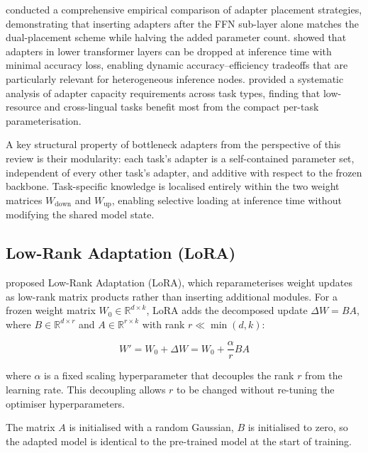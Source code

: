 \citet{HeEffectiveness2021} conducted a comprehensive empirical comparison of adapter
placement strategies, demonstrating that inserting adapters after the FFN sub-layer
alone matches the dual-placement scheme while halving the added parameter count.
\citet{RuckleAdapterDrop2021} showed that adapters in lower transformer layers can be
dropped at inference time with minimal accuracy loss, enabling dynamic accuracy--efficiency
tradeoffs that are particularly relevant for heterogeneous inference nodes.
\citet{PothAdapters2023} provided a systematic analysis of adapter capacity requirements
across task types, finding that low-resource and cross-lingual tasks benefit most from
the compact per-task parameterisation.

A key structural property of bottleneck adapters from the perspective of this review is
their modularity: each task's adapter is a self-contained parameter set, independent of
every other task's adapter, and additive with respect to the frozen backbone.
Task-specific knowledge is localised entirely within the two weight matrices
$W_\mathrm{down}$ and $W_\mathrm{up}$, enabling selective loading at inference time
without modifying the shared model state.

\subsection{Low-Rank Adaptation (LoRA)}
\label{sec:peft:lora}

\citet{Hu2022} proposed Low-Rank Adaptation (LoRA), which reparameterises weight updates
as low-rank matrix products rather than inserting additional modules. For a frozen
weight matrix $W_0 \in \mathbb{R}^{d \times k}$, LoRA adds the decomposed update
$\Delta W = BA$, where $B \in \mathbb{R}^{d \times r}$ and $A \in \mathbb{R}^{r \times k}$
with rank $r \ll \min(d, k)$:

\begin{equation}
W' = W_0 + \Delta W = W_0 + \frac{\alpha}{r} BA
\label{eq:lora_intro}
\end{equation}

where $\alpha$ is a fixed scaling hyperparameter that decouples the rank $r$ from the learning rate. This decoupling allows $r$ to be changed without re-tuning the optimiser hyperparameters.

The matrix $A$ is initialised with a random Gaussian, $B$ is initialised to zero, so
the adapted model is identical to the pre-trained model at the start of training. 

